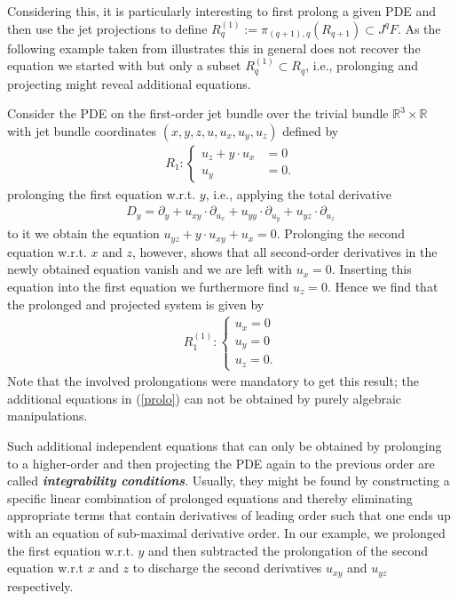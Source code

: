 Considering this, it is particularly interesting to first prolong a given PDE and then use the jet projections to define $R_q^{(1)} := \pi_{(q+1),q}\left ( R_{q+1} \right ) \subset J^qF $. As the following example taken from \cite{seiler1994analysis} illustrates this in general does not recover the equation we started with but only a subset $R_q^{(1)} \subset R_q$, i.e., prolonging and projecting might reveal additional equations.
\begin{example}
Consider the PDE on the first-order jet bundle over the trivial bundle $\mathbb{R}^3 \times \mathbb{R}$ with jet bundle  coordinates $(x,y,z,u,u_x,u_y,u_z)$ defined by 
\begin{align}
    R_1 : \begin{cases} u_z + y \cdot u_x &= 0 \\
                        u_y &= 0.
            \end{cases}
\end{align}
prolonging the first equation w.r.t. $y$, i.e., applying the total derivative 
\begin{align}
D_y = \partial_y + u_{xy} \cdot \partial_{u_x} + u_{yy} \cdot \partial_{u_y} + u_{yz} \cdot \partial_{u_z}
\end{align}
to it we obtain the equation $u_{yz} + y \cdot u_{xy} + u_x =0$. Prolonging the second equation w.r.t. $x$ and $z$, however, shows that all second-order derivatives in the newly obtained equation vanish and we are left with $u_x = 0$. Inserting this equation into the first equation we furthermore find $u_z = 0$. Hence we find that the prolonged and projected system is given by 
\begin{align}\label{prolo}
    R_1^{(1)} : \begin{cases} u_x = 0 \\
                        u_y = 0\\
                        u_z = 0 .
            \end{cases}
\end{align}
Note that the involved prolongations were mandatory to get this result; the additional equations in (\ref{prolo})  can not be obtained by purely algebraic manipulations. 
\end{example}
Such additional independent equations that can only be obtained by prolonging to a higher-order and then projecting the PDE again to the previous order are called \textit{\textbf{integrability conditions}}. 
Usually, they might be found by constructing a specific linear combination of prolonged equations and thereby eliminating appropriate terms that contain derivatives of leading order such that one ends up with an equation of sub-maximal derivative order. In our example, we prolonged the first equation w.r.t. $y$ and then subtracted the prolongation of the second equation w.r.t $x$ and $z$ to discharge the second derivatives $u_{xy}$ and $u_{yz}$ respectively. 

